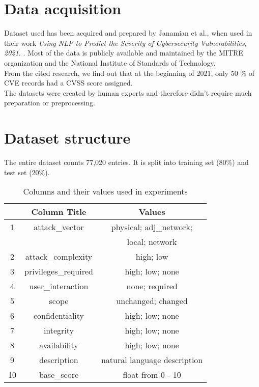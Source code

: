 \documentclass[times, utf8, zavrsni, english]{fer}
\begin{document}
\section{Data acquisition}
Dataset used has been acquired and prepared by Janamian et al., when used in their work \emph{Using NLP to Predict the Severity of Cybersecurity Vulnerabilities, 2021.} \citep{vulnerwatch}.
Most of the data is publicly available and maintained by the MITRE organization and the National Institute of Standards of Technology. \\
From the cited research, we find out that at the beginning of 2021, only 50 \% of CVE records had a CVSS score assigned. \\
The datasets were created by human experts and therefore didn't require much preparation or preprocessing. 

\section{Dataset structure}
The entire dataset counts 77,020 entries. It is split into training set (80\%) and test set (20\%).

\begin{table}[h!]
	\centering
	\begin{tabular}{||c c c ||} 
		\hline
		 & Column Title & Values  \\ [0.5ex] 
		\hline\hline
		
		1 & attack\_vector & physical; adj\_network;   \\
		 & &  local; network \\
		2 & attack\_complexity & high; low  \\
		3 & privileges\_required & high; low; none  \\
		4 & user\_interaction & none; required \\ 
		5 & scope & unchanged; changed \\ 
		6 & confidentiality & high; low; none  \\
		7 & integrity & high; low; none  \\
		8 & availability & high; low; none  \\
		
		\hline\hline
		9 & description & natural language description \\
		10 & base\_score & float from 0 - 10 \\
		\hline
	\end{tabular}
\caption{Columns and their values used in experiments}
\label{table:1}
\end{table}
\end{document}
